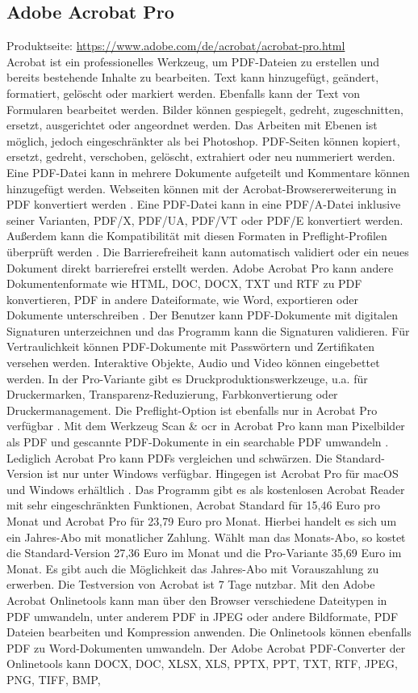 \subsection{Adobe Acrobat Pro}
Produktseite: \url{https://www.adobe.com/de/acrobat/acrobat-pro.html} \\
Acrobat ist ein professionelles Werkzeug, um PDF-Dateien zu erstellen und bereits bestehende Inhalte zu bearbeiten. Text kann hinzugefügt, geändert, formatiert, gelöscht oder markiert werden. Ebenfalls kann der Text von Formularen bearbeitet werden. Bilder können gespiegelt, gedreht, zugeschnitten, ersetzt, ausgerichtet oder angeordnet werden. Das Arbeiten mit Ebenen ist möglich, jedoch eingeschränkter als bei Photoshop. PDF-Seiten können kopiert, ersetzt, gedreht, verschoben, gelöscht, extrahiert oder neu nummeriert werden. Eine PDF-Datei kann in mehrere Dokumente aufgeteilt und Kommentare können hinzugefügt werden. Webseiten können mit der Acrobat-Browsererweiterung in PDF konvertiert werden \cite{adobe-acrobat-um}. Eine PDF-Datei kann in eine PDF/A-Datei inklusive seiner Varianten, PDF/X, PDF/UA, PDF/VT oder PDF/E konvertiert werden. Außerdem kann die Kompatibilität mit diesen Formaten in Preflight-Profilen überprüft werden \cite{adobe-pdf-a}. Die Barrierefreiheit kann automatisch validiert oder ein neues Dokument direkt barrierefrei erstellt werden. Adobe Acrobat Pro kann andere Dokumentenformate wie HTML, DOC, DOCX, TXT und RTF zu PDF konvertieren, PDF in andere Dateiformate, wie Word, exportieren oder Dokumente unterschreiben \cite{adobe-formate}. Der Benutzer kann PDF-Dokumente mit digitalen Signaturen unterzeichnen und das Programm kann die Signaturen validieren. Für Vertraulichkeit können PDF-Dokumente mit Passwörtern und Zertifikaten versehen werden. Interaktive Objekte, Audio und Video können eingebettet werden. In der Pro-Variante gibt es Druckproduktionswerkzeuge, u.a. für Druckermarken, Transparenz-Reduzierung, Farbkonvertierung oder Druckermanagement. Die Preflight-Option ist ebenfalls nur in Acrobat Pro verfügbar \cite{adobe-acrobat-um}. Mit dem Werkzeug Scan \& \gls{ocr} in Acrobat Pro kann man Pixelbilder als PDF und gescannte PDF-Dokumente in ein searchable PDF umwandeln \cite{adobe-search}. Lediglich Acrobat Pro kann PDFs vergleichen und schwärzen. Die Standard-Version ist nur unter Windows verfügbar. Hingegen ist Acrobat Pro für macOS und Windows erhältlich \cite{wondershare-acrobat}. Das Programm gibt es als kostenlosen Acrobat Reader mit sehr eingeschränkten Funktionen, Acrobat Standard für 15,46 Euro pro Monat und Acrobat Pro für 23,79 Euro pro Monat. Hierbei handelt es sich um ein Jahres-Abo mit monatlicher Zahlung. Wählt man das Monats-Abo, so kostet die Standard-Version 27,36 Euro im Monat und die Pro-Variante 35,69 Euro im Monat. Es gibt auch die Möglichkeit das Jahres-Abo mit Vorauszahlung zu erwerben. Die Testversion von Acrobat ist 7 Tage nutzbar. Mit den Adobe Acrobat Onlinetools kann man über den Browser verschiedene Dateitypen in PDF umwandeln, unter anderem PDF in JPEG oder andere Bildformate, PDF Dateien bearbeiten und Kompression anwenden. Die Onlinetools können ebenfalls PDF zu Word-Dokumenten umwandeln. \cite{adobe-search} Der Adobe Acrobat PDF-Converter der Onlinetools kann DOCX, DOC, XLSX, XLS, PPTX, PPT, TXT, RTF, JPEG, PNG, TIFF, BMP, 